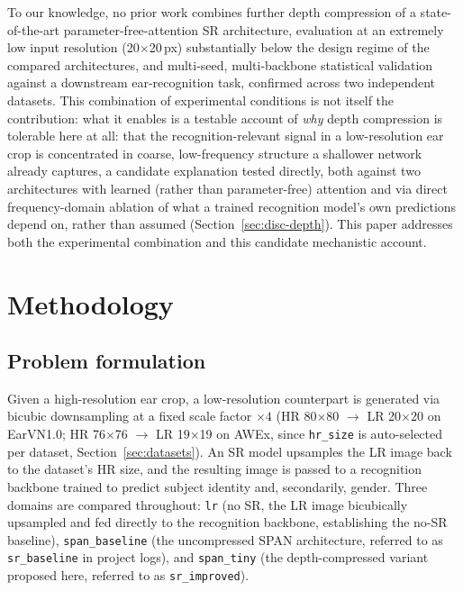 \documentclass[pdflatex,sn-vancouver-num]{sn-jnl}
\begin{document}
To our knowledge, no prior work combines further depth compression of a state-of-the-art parameter-free-attention SR architecture, evaluation at an extremely low input resolution (20$\times$20\,px) substantially below the design regime of the compared architectures, and multi-seed, multi-backbone statistical validation against a downstream ear-recognition task, confirmed across two independent datasets. This combination of experimental conditions is not itself the contribution: what it enables is a testable account of \emph{why} depth compression is tolerable here at all: that the recognition-relevant signal in a low-resolution ear crop is concentrated in coarse, low-frequency structure a shallower network already captures, a candidate explanation tested directly, both against two architectures with learned (rather than parameter-free) attention and via direct frequency-domain ablation of what a trained recognition model's own predictions depend on, rather than assumed (Section~\ref{sec:disc-depth}). This paper addresses both the experimental combination and this candidate mechanistic account.

\section{Methodology}
\label{sec:method}

\subsection{Problem formulation}

Given a high-resolution ear crop, a low-resolution counterpart is generated via bicubic downsampling at a fixed scale factor $\times4$ (HR 80$\times$80 $\to$ LR 20$\times$20 on EarVN1.0; HR 76$\times$76 $\to$ LR 19$\times$19 on AWEx, since \texttt{hr\_size} is auto-selected per dataset, Section~\ref{sec:datasets}). An SR model upsamples the LR image back to the dataset's HR size, and the resulting image is passed to a recognition backbone trained to predict subject identity and, secondarily, gender. Three domains are compared throughout: \texttt{lr} (no SR, the LR image bicubically upsampled and fed directly to the recognition backbone, establishing the no-SR baseline), \texttt{span\_baseline} (the uncompressed SPAN architecture, referred to as \texttt{sr\_baseline} in project logs), and \texttt{span\_tiny} (the depth-compressed variant proposed here, referred to as \texttt{sr\_improved}).
\end{document}
